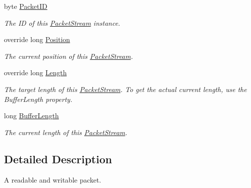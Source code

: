 \begin{DoxyCompactItemize}
\item 
byte \hyperlink{class_gonzo_net_1_1_packet_stream_af7bf56ad63d4b95316b95bb1e601cdd3}{Packet\+I\+D}
\begin{DoxyCompactList}\small\item\em The I\+D of this \hyperlink{class_gonzo_net_1_1_packet_stream}{Packet\+Stream} instance. \end{DoxyCompactList}\item 
override long \hyperlink{class_gonzo_net_1_1_packet_stream_a31c12428a8c4be18a8230252c95f6bcc}{Position}
\begin{DoxyCompactList}\small\item\em The current position of this \hyperlink{class_gonzo_net_1_1_packet_stream}{Packet\+Stream}. \end{DoxyCompactList}\item 
override long \hyperlink{class_gonzo_net_1_1_packet_stream_a8d15de3e1c877c4e8dc19080b6f6d3ec}{Length}
\begin{DoxyCompactList}\small\item\em The target length of this \hyperlink{class_gonzo_net_1_1_packet_stream}{Packet\+Stream}. To get the actual current length, use the Buffer\+Length property. \end{DoxyCompactList}\item 
long \hyperlink{class_gonzo_net_1_1_packet_stream_ab2d81a0dcb402aa08c8bf16fbc3de794}{Buffer\+Length}
\begin{DoxyCompactList}\small\item\em The current length of this \hyperlink{class_gonzo_net_1_1_packet_stream}{Packet\+Stream}. \end{DoxyCompactList}\end{DoxyCompactItemize}


\subsection{Detailed Description}
A readable and writable packet. 



